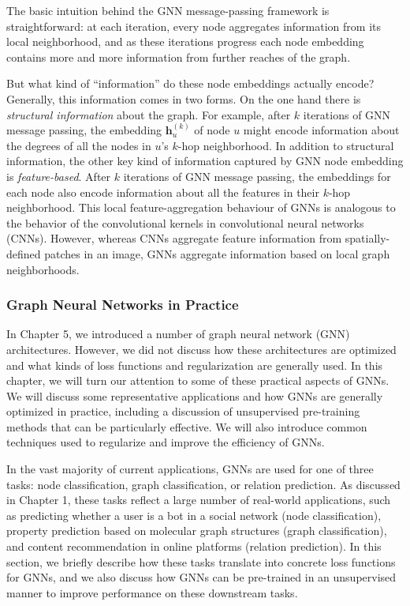 \documentclass[10pt, onecolumn]{article}
\let\defaultmarginpar\marginpar
\renewcommand\marginpar[2][]{\defaultmarginpar{\itshape\color{gray}#2}}
\begin{document}
The basic intuition behind the GNN message-passing framework is straightforward: at each iteration, every node aggregates information from its local neighborhood, and as these iterations progress each node embedding contains more and more information from further reaches of the graph.

But what kind of ``information'' do these node embeddings actually encode? Generally, this information comes in two forms. On the one hand there is \emph{structural information}\marginpar{structural information} about the graph. For example, after $k$ iterations of GNN message passing, the embedding $\mathbf h^{(k)}_u$ of node $u$ might encode information about
the degrees of all the nodes in $u$'s $k$-hop neighborhood. In addition to structural information, the other key kind of information
captured by GNN node embedding is \emph{feature-based}\marginpar{feature-based}. After $k$ iterations of GNN message passing, the embeddings for each node also encode information about all the features in their $k$-hop neighborhood. This local feature-aggregation behaviour of GNNs is analogous to the behavior of the convolutional kernels in convolutional neural networks (CNNs). However, whereas CNNs aggregate
feature information from spatially-defined patches in an image, GNNs aggregate information based on local graph neighborhoods.


\subsubsection{Graph Neural Networks in Practice}

In Chapter 5, we introduced a number of graph neural network (GNN) architectures. However, we did not discuss how these architectures are optimized and
what kinds of loss functions and regularization are generally used. In this chapter, we will turn our attention to some of these practical aspects of GNNs. We
will discuss some representative applications and how GNNs are generally optimized in practice, including a discussion of unsupervised pre-training methods
that can be particularly effective. We will also introduce common techniques
used to regularize and improve the efficiency of GNNs.

In the vast majority of current applications, GNNs are used for one of three
tasks: node classification, graph classification, or relation prediction. As discussed in Chapter 1, these tasks reflect a large number of real-world applications,
such as predicting whether a user is a bot in a social network (node classification), property prediction based on molecular graph structures (graph classification), and content recommendation in online platforms (relation prediction).
In this section, we briefly describe how these tasks translate into concrete loss
functions for GNNs, and we also discuss how GNNs can be pre-trained in an
unsupervised manner to improve performance on these downstream tasks.
\end{document}
